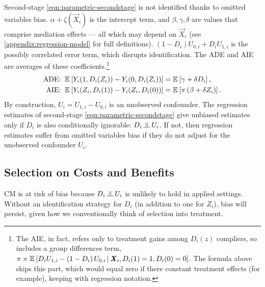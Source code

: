 Second-stage \eqref{eqn:parametric-secondstage} is not identified thanks to omitted variables bias.
$\alpha + \zeta(\vec X_i)$ is the intercept term, and $\beta, \gamma, \delta$ are values that comprise mediation effects --- all which may depend on $\vec X_i$ (see \autoref{appendix:regression-model} for full definitions).
$\left(1 - D_i \right)U_{0,i} + D_i U_{1,i}$ is the possibly correlated error term, which disrupts identification.
The ADE and AIE are averages of these coefficients.\footnote{
    The AIE, in fact, refers only to treatment gains among $D_i(z)$ compliers, so includes a group differences term, $\pi \times\mathbb{E}_{} \left[ 
            D_i U_{1,i} - \left(1 - D_i \right)U_{0,i}
         \, \middle\vert \, \boldsymbol{\mathit{X}}_i, D_i(1) = 1, D_i(0) = 0 \right] $.
    The formula above skips this part, which would equal zero if there constant treatment effects (for example), keeping with regression notation.
}
\begin{align*}
    \text{ADE:} \;\; \mathbb{E}_{} \left[ Y_i(1, D_i(Z_i)) - Y_i(0, D_i(Z_i)) \right]
        &= \mathbb{E}_{} \left[ \gamma + \delta D_i \right], \\
    \text{AIE:} \;\; \mathbb{E}_{} \left[ Y_i(Z_i, D_i(1)) - Y_i(Z_i, D_i(0)) \right]
        &= \mathbb{E}_{} \left[  \pi \left( \beta +  \delta Z_i \right) \right].
\end{align*}
By construction, $U_i = U_{1, i} - U_{0, i}$ is an unobserved confounder.
The regression estimates of second-stage \eqref{eqn:parametric-secondstage} give unbiased estimates only if $D_i$ is also conditionally ignorable: $D_i \indep  U_i$.
If not, then regression estimates suffer from omitted variables bias if they do not adjust for the unobserved confounder $U_i$.

\subsection{Selection on Costs and Benefits}
CM is at risk of bias because $D_i \indep  U_i$ is unlikely to hold in applied settings.
Without an identification strategy for $D_i$ (in addition to one for $Z_i$), bias will persist, given how we conventionally think of selection into treatment.


